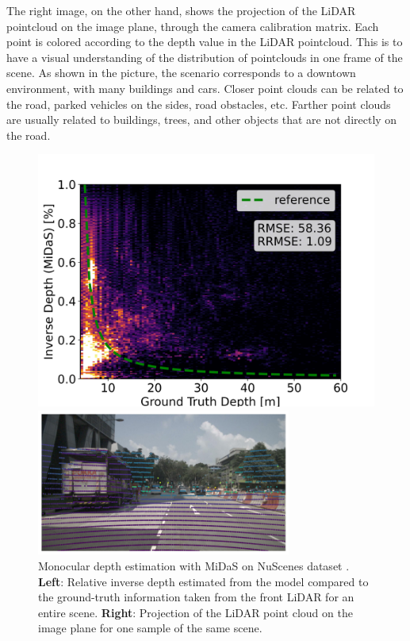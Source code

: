 The right image, on the other hand, 
shows the projection of the LiDAR pointcloud on the image plane, through the 
camera calibration matrix. Each point is colored according to the depth value 
in the LiDAR pointcloud. This is to have a visual understanding of the distribution 
of pointclouds in one frame of the scene. As shown in the picture, the scenario 
corresponds to a downtown environment, with many buildings and cars. 
Closer point clouds can be related to the road, parked vehicles on the sides, 
road obstacles, etc. Farther point clouds are usually related to buildings, 
trees, and other objects that are not directly on the road.
\begin{figure}
    \centering
    \begin{minipage}{0.52\textwidth}
        \centering
        \includegraphics[width=\textwidth]{images/nuscenes/depth_0.png} %
    \end{minipage}\hfill
    \begin{minipage}{0.47\textwidth}
        \centering
        \includegraphics[width=\textwidth, height=4.8cm]{images/nuscenes/lidar_over_img.png} %
    \end{minipage}
    \caption{Monocular depth estimation with MiDaS on NuScenes dataset \cite{nuscenes}.
    \textbf{Left}: Relative inverse depth estimated from the model compared to 
    the ground-truth information taken from the front LiDAR for an entire scene.
    \textbf{Right}: Projection of the LiDAR point cloud on the image plane for
    one sample of the same scene.} 
    \label{fig:mde}
\end{figure}

